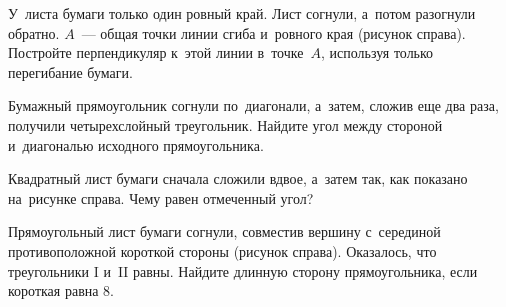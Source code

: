 


\begin{problems}

\item
\begin{minipage}[t][][t]{0.65\linewidth}
У~листа бумаги только один ровный край.
Лист согнули, а~потом разогнули обратно.
$A$~--- общая точки линии сгиба и~ровного края (рисунок справа).
Постройте перпендикуляр к~этой линии в~точке~$A$, используя только перегибание
бумаги.
\end{minipage}\hfill
\begin{minipage}[t][][b]{0.32\linewidth}\vspace{-2ex}\flushright
{}
\vspace{1ex}
\end{minipage}

\item
Бумажный прямоугольник согнули по~диагонали, а~затем, сложив еще два раза,
получили четырехслойный треугольник.
Найдите угол между стороной и~диагональю исходного прямоугольника.

\item
\begin{minipage}[t][][t]{0.65\linewidth}
Квадратный лист бумаги сначала сложили вдвое, а~затем так, как показано
на~рисунке справа.
Чему равен отмеченный угол?
\end{minipage}\hfill
\begin{minipage}[t][][b]{0.32\linewidth}\vspace{-1ex}\flushright
{}
\qquad
{}
\vspace{1ex}
\end{minipage}

\item
\begin{minipage}[t][][t]{0.70\linewidth}
Прямоугольный лист бумаги согнули, совместив вершину с~серединой
противоположной короткой стороны (рисунок справа).
Оказалось, что треугольники I и~II равны.
Найдите длинную сторону прямоугольника, если короткая равна 8.
\end{minipage}\hfill
\begin{minipage}[t][][b]{0.27\linewidth}\vspace{-1ex}\flushright
{}
\vspace{1ex}
\end{minipage}


\end{problems}
